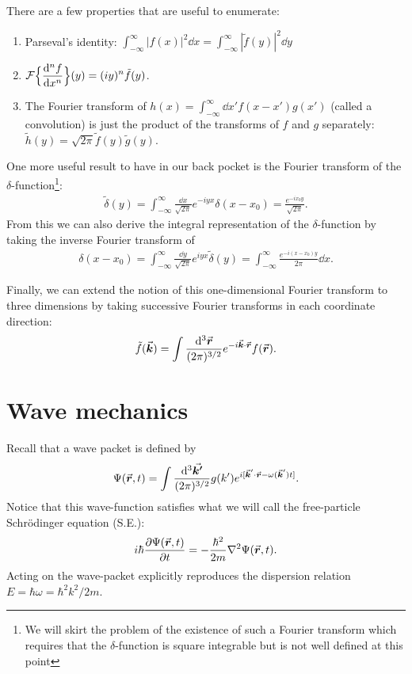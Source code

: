 There are a few properties that are useful to enumerate:
\begin{enumerate}
    \item Parseval's identity: $\displaystyle \int_{-\infty}^{\infty} |f(x)|^2 \dd{x} = \int_{-\infty}^{\infty} |\tilde{f}(y)|^2 \dd{y}$
    \item $\displaystyle \mathcal{F}\Big\{ \dv[n]{f}{x} \Big\} (y) = (iy)^{n} \tilde{f}(y)$.
    \item The Fourier transform of $h(x) = \int_{-\infty}^{\infty} \dd{x'} f(x - x')g(x')$ (called a convolution) is just the product of the transforms of $f$ and $g$ separately: $\tilde{h}(y) = \sqrt{2 \pi} \tilde{f}(y) \tilde{g}(y)$.
\end{enumerate}

One more useful result to have in our back pocket is the Fourier transform of the $\delta$-function\footnote{We will skirt the problem of the existence of such a Fourier transform which requires that the $\delta$-function is square integrable but is not well defined at this point}:
\begin{eqnarray}
    \label{eq:fourier-delta}
    \tilde{\delta}(y) = \int_{-\infty}^{\infty} \frac{\dd{x}}{\sqrt{2 \pi}} e^{-iyx} \delta(x - x_0) = \frac{e^{-i x_0 y}}{\sqrt{2 \pi}}
.\end{eqnarray}
From this we can also derive the integral representation of the $\delta$-function by taking the inverse Fourier transform of 
\begin{eqnarray}
    \delta(x - x_0) = \int_{-\infty}^{\infty} \frac{\dd{y}}{\sqrt{2 \pi}} e^{i y x} \tilde{\delta}(y) = \int_{-\infty}^{\infty} \frac{e^{-i(x - x_0)y}}{2 \pi} \dd{x}
.\end{eqnarray}

Finally, we can extend the notion of this one-dimensional Fourier transform to three dimensions by taking successive Fourier transforms in each coordinate direction:
\begin{eqnarray}
    \tilde{f}(\va*{k}) = \int \frac{\dd[3]{\va*{r}}}{(2 \pi)^{3/2}} e^{-i \va*{k} \cdot \va*{r}} f(\va*{r})
.\end{eqnarray}


\section{Wave mechanics}

Recall that a wave packet is defined by
\begin{eqnarray}
    \Psi(\va*{r},t) = \int \frac{\dd[3]{\va*{k'}}}{(2 \pi)^{3/2}} g(k') e^{i[ \va*{k}' \cdot \va*{r} - \omega(\va*{k}') t ]}
.\end{eqnarray}
Notice that this wave-function satisfies what we will call the free-particle Schr\"{o}dinger equation (S.E.):
\begin{eqnarray}
    i \hbar \pdv{\Psi(\va*{r},t)}{t} = -\frac{\hbar^2}{2m} \laplacian \Psi(\va*{r},t)
.\end{eqnarray}
Acting on the wave-packet explicitly reproduces the dispersion relation $E = \hbar \omega = \hbar^2 k^2 / 2m$.

